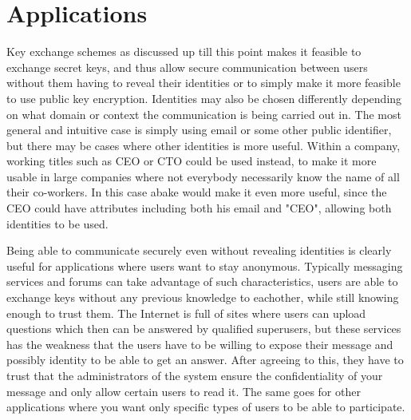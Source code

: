 \section{Applications}\label{sec:apps}
Key exchange schemes as discussed up till this point makes it feasible to exchange secret keys, and thus allow secure communication between users without them having to reveal their identities or to simply make it more feasible to use public key encryption. Identities may also be chosen differently depending on what domain or context the communication is being carried out in. The most general and intuitive case is simply using email or some other public identifier, but there may be cases where other identities is more useful. Within a company, working titles such as CEO or CTO could be used instead, to make it more usable in large companies where not everybody necessarily know the name of all their co-workers. In this case \gls{abake} would make it even more useful, since the CEO could have attributes including both his email and "CEO", allowing both identities to be used. 
\par Being able to communicate securely even without revealing identities is clearly useful for applications where users want to stay anonymous. Typically messaging services and forums can take advantage of such characteristics, users are able to exchange keys without any previous knowledge to eachother, while still knowing enough to trust them. The Internet is full of sites where users can upload questions which then can be answered by qualified superusers, but these services has the weakness that the users have to be willing to expose their message and possibly identity to be able to get an answer. After agreeing to this, they have to trust that the administrators of the system ensure the confidentiality of your message and only allow certain users to read it. The same goes for other applications where you want only specific types of users to be able to participate. 

